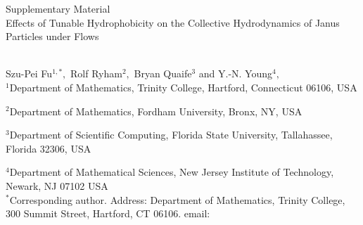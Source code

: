 
\thispagestyle{empty}

\newpage
{\Large \bf

  \noindent Supplementary Material\\

  \noindent 
 Effects of Tunable Hydrophobicity on the Collective Hydrodynamics of Janus Particles under Flows}\\

\noindent 
Szu-Pei Fu$^{1,*},$ 
Rolf Ryham$^{2},$ 
Bryan Quaife$^{3}$ and Y.-N. Young$^{4},$
\\

\noindent
$^{1}$Department of Mathematics, Trinity College, Hartford, Connecticut 06106, USA

\noindent
$^{2}$Department of Mathematics, Fordham University, Bronx, NY, USA

\noindent
$^{3}$Department of Scientific Computing, Florida State University, Tallahassee, Florida 32306, USA

\noindent
$^{4}$Department of Mathematical Sciences, New Jersey Institute of Technology, Newark, NJ 07102 USA
\\

\noindent $^*$Corresponding author. Address: Department of Mathematics, Trinity College, 
300 Summit Street, Hartford, CT 06106. email: 



\setcounter{page}{1}

\setcounter{figure}{0}
\renewcommand{\thefigure}{S\arabic{figure}}

\setcounter{equation}{0}
\renewcommand{\theequation}{S\arabic{equation}}

\setcounter{section}{0}
\renewcommand{\thesection}{S\arabic{section}} 




